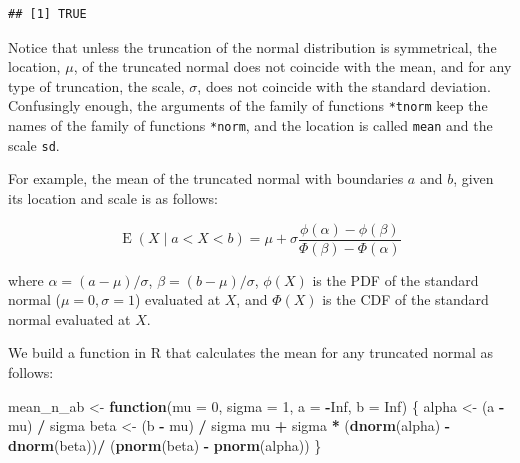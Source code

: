 \documentclass[12pt,]{krantz}
\newenvironment{Shaded}{\begin{snugshade}}{\end{snugshade}}
\newcommand{\ControlFlowTok}[1]{\textcolor[rgb]{0.13,0.29,0.53}{\textbf{#1}}}
\newcommand{\DataTypeTok}[1]{\textcolor[rgb]{0.13,0.29,0.53}{#1}}
\newcommand{\DecValTok}[1]{\textcolor[rgb]{0.00,0.00,0.81}{#1}}
\newcommand{\KeywordTok}[1]{\textcolor[rgb]{0.13,0.29,0.53}{\textbf{#1}}}
\newcommand{\NormalTok}[1]{#1}
\newcommand{\OperatorTok}[1]{\textcolor[rgb]{0.81,0.36,0.00}{\textbf{#1}}}
\newcommand{\OtherTok}[1]{\textcolor[rgb]{0.56,0.35,0.01}{#1}}
\newcommand{\StringTok}[1]{\textcolor[rgb]{0.31,0.60,0.02}{#1}}
\theoremstyle{definition}
\theoremstyle{definition}
\theoremstyle{definition}
\theoremstyle{remark}
\begin{document}
\begin{verbatim}
## [1] TRUE
\end{verbatim}

Notice that unless the truncation of the normal distribution is symmetrical, the location, \(\mu\), of the truncated normal does not coincide with the mean, and for any type of truncation, the scale, \(\sigma\), does not coincide with the standard deviation. Confusingly enough, the arguments of the family of functions \texttt{*tnorm} keep the names of the family of functions \texttt{*norm}, and the location is called \texttt{mean} and the scale \texttt{sd}.

For example, the mean of the truncated normal with boundaries \(a\) and \(b\), given its location and scale is as follows:

\begin{equation}
\operatorname {E} (X\mid a<X<b) = \mu +\sigma {\frac {\phi (\alpha )-\phi (\beta )}{\Phi (\beta )-\Phi (\alpha )}} 
\end{equation}

where \(\alpha =(a-\mu )/\sigma\), \(\beta =(b-\mu )/\sigma\), \(\phi(X)\) is the PDF of the standard normal (\(\mu=0, \sigma=1\)) evaluated at \(X\), and \(\Phi(X)\) is the CDF of the standard normal evaluated at \(X\).

We build a function in R that calculates the mean for any truncated normal as follows:

\begin{Shaded}
\begin{Highlighting}[]
\NormalTok{mean_n_ab <-}\StringTok{ }\ControlFlowTok{function}\NormalTok{(}\DataTypeTok{mu =} \DecValTok{0}\NormalTok{, }\DataTypeTok{sigma =} \DecValTok{1}\NormalTok{, }\DataTypeTok{a =} \OperatorTok{-}\OtherTok{Inf}\NormalTok{, }\DataTypeTok{b =} \OtherTok{Inf}\NormalTok{) \{}
\NormalTok{  alpha <-}\StringTok{ }\NormalTok{(a }\OperatorTok{-}\StringTok{ }\NormalTok{mu) }\OperatorTok{/}\StringTok{ }\NormalTok{sigma}
\NormalTok{  beta <-}\StringTok{ }\NormalTok{(b }\OperatorTok{-}\StringTok{ }\NormalTok{mu) }\OperatorTok{/}\StringTok{ }\NormalTok{sigma}
\NormalTok{  mu }\OperatorTok{+}\StringTok{ }\NormalTok{sigma }\OperatorTok{*}\StringTok{ }\NormalTok{(}\KeywordTok{dnorm}\NormalTok{(alpha) }\OperatorTok{-}\StringTok{ }\KeywordTok{dnorm}\NormalTok{(beta))}\OperatorTok{/}
\StringTok{    }\NormalTok{(}\KeywordTok{pnorm}\NormalTok{(beta) }\OperatorTok{-}\StringTok{ }\KeywordTok{pnorm}\NormalTok{(alpha))}
\NormalTok{\}}
\end{Highlighting}
\end{Shaded}
\end{document}
